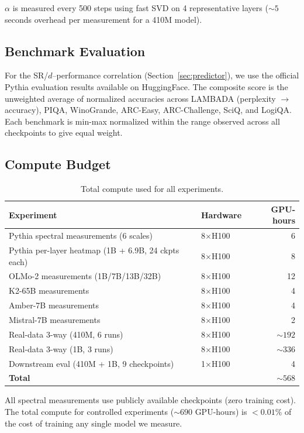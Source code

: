 $\alpha$ is measured every 500 steps using fast SVD on 4 representative layers (${\sim}5$ seconds overhead per measurement for a 410M model).

\subsection{Benchmark Evaluation}

For the SR/$d$--performance correlation (Section~\ref{sec:predictor}), we use the official Pythia evaluation results available on HuggingFace. The composite score is the unweighted average of normalized accuracies across LAMBADA (perplexity $\to$ accuracy), PIQA, WinoGrande, ARC-Easy, ARC-Challenge, SciQ, and LogiQA. Each benchmark is min-max normalized within the range observed across all checkpoints to give equal weight.

\subsection{Compute Budget}

\begin{table}[h]
\centering
\small
\caption{Total compute used for all experiments.}
\begin{tabular}{@{}llr@{}}
\toprule
\textbf{Experiment} & \textbf{Hardware} & \textbf{GPU-hours} \\
\midrule
Pythia spectral measurements (6 scales) & 8$\times$H100 & 6 \\
Pythia per-layer heatmap (1B + 6.9B, 24 ckpts each) & 8$\times$H100 & 8 \\
OLMo-2 measurements (1B/7B/13B/32B) & 8$\times$H100 & 12 \\
K2-65B measurements & 8$\times$H100 & 4 \\
Amber-7B measurements & 8$\times$H100 & 4 \\
Mistral-7B measurements & 8$\times$H100 & 2 \\
Real-data 3-way (410M, 6 runs) & 8$\times$H100 & ${\sim}192$ \\
Real-data 3-way (1B, 3 runs) & 8$\times$H100 & ${\sim}336$ \\
Downstream eval (410M + 1B, 9 checkpoints) & 1$\times$H100 & 4 \\
\midrule
\textbf{Total} & & ${\sim}568$ \\
\bottomrule
\end{tabular}
\end{table}

All spectral measurements use publicly available checkpoints (zero training cost). The total compute for controlled experiments (${\sim}690$ GPU-hours) is $<0.01\%$ of the cost of training any single model we measure.

